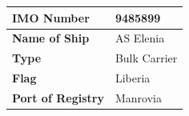 \documentclass{article}
\begin{document}
\makeCoverPage
{} %


\ClearWallPaper %

\begin{center}
\renewcommand{\arraystretch}{1.6}
\begin{table}[]
\begin{tabular}{|l|l|}
\hline
\textbf{IMO Number}               & 9485899                                                                                                                                                                                                                                                        \\ \hline
\textbf{Name of Ship}             & AS Elenia                                                                                                                                                                                                                                                      \\ \hline
\textbf{Type}                     & Bulk Carrier                                                                                                                                                                                                                                                   \\ \hline
\textbf{Flag}                     & Liberia                                                                                                                                                                                                                                                        \\ \hline
\textbf{Port of Registry}         & Manrovia                                                                                                                                                                                                                                                       \\ \hline

\end{tabular}
\end{table}
\end{center}
\end{document}
